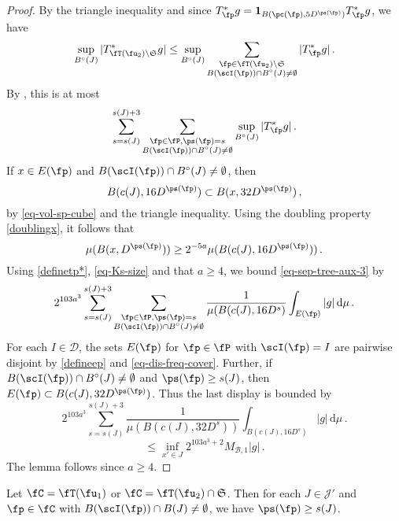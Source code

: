     \begin{proof}
        By the triangle inequality and since $T_{\fp}^* g = \mathbf{1}_{B(\pc(\fp), 5D^{\ps(\fp)})} T_{\fp}^* g$, we have
        $$
            \sup_{B^\circ{}(J)} |T_{\fT(\fu_2) \setminus\mathfrak{S}}^* g|
            \leq \sup_{B^\circ{}(J)} \sum_{\substack{\fp \in \fT(\fu_2) \setminus \mathfrak{S}\\ B(\scI(\fp)) \cap B^\circ(J) \ne \emptyset}} |T_{\fp}^*g|\,.
        $$
        By , this is at most
        \begin{equation}
            \label{eq-sep-tree-aux-3}
            \sum_{s = s(J)}^{s(J) + 3} \sum_{\substack{\fp \in \fP, \ps(\fp) = s\\ B(\scI(\fp)) \cap B^\circ(J) \ne \emptyset}} \sup_{B^\circ{}(J)} |T_{\fp}^* g|\,.
        \end{equation}
        If $x \in E(\fp)$ and $B(\scI(\fp)) \cap B^\circ(J) \ne \emptyset$, then
        $$
            B(c(J), 16D^{\ps(\fp)}) \subset B(x, 32 D^{\ps(\fp)})\,,
        $$
        by \eqref{eq-vol-sp-cube} and the triangle inequality. Using the doubling property \eqref{doublingx}, it follows that
        $$
            \mu(B(x, D^{\ps(\fp)})) \ge 2^{-5a} \mu(B(c(J), 16D^{\ps(\fp)}))\,.
        $$
        Using \eqref{definetp*}, \eqref{eq-Ks-size} and that $a \ge 4$, we bound \eqref{eq-sep-tree-aux-3} by
        $$
            2^{103a^3}\sum_{s = s(J)}^{s(J) + 3} \sum_{\substack{\fp \in \fP, \ps(\fp) = s\\B(\scI(\fp)) \cap B^\circ(J) \ne \emptyset}} \frac{1}{\mu(B(c(J), 16 D^s)} \int_{E(\fp)} |g| \, \mathrm{d}\mu\,.
        $$
        For each $I \in \mathcal{D}$, the sets $E(\fp)$ for $\fp \in \fP$ with $\scI(\fp) = I$ are pairwise disjoint by \eqref{defineep} and \eqref{eq-dis-freq-cover}. Further, if $B(\scI(\fp)) \cap B^\circ(J) \ne \emptyset$ and $\ps(\fp) \ge s(J)$, then $E(\fp) \subset B(c(J), 32 D^{\ps(\fp)})$. Thus the last display is bounded by
        $$
            2^{103a^3}\sum_{s = s(J)}^{s(J) + 3} \frac{1}{\mu(B(c(J), 32 D^s))} \int_{B(c(J), 16 D^s)} |g| \, \mathrm{d}\mu\,.
        $$
        $$
            \le \inf_{x' \in J} 2^{103a^3 +2} M_{\mathcal{B}, 1} |g|\,.
        $$
        The lemma follows since $a \ge 4$.
    \end{proof}

    \begin{lemma}
        \label{scales-impacting-interval}
        Let $\fC = \fT(\fu_1)$ or $\fC = \fT(\fu_2) \cap \mathfrak{S}$. Then for each $J \in \mathcal{J}'$ and $\fp \in \fC$ with $B(\scI(\fp)) \cap B(J) \neq \emptyset$, we have $\ps(\fp) \ge s(J)$.
    \end{lemma}

